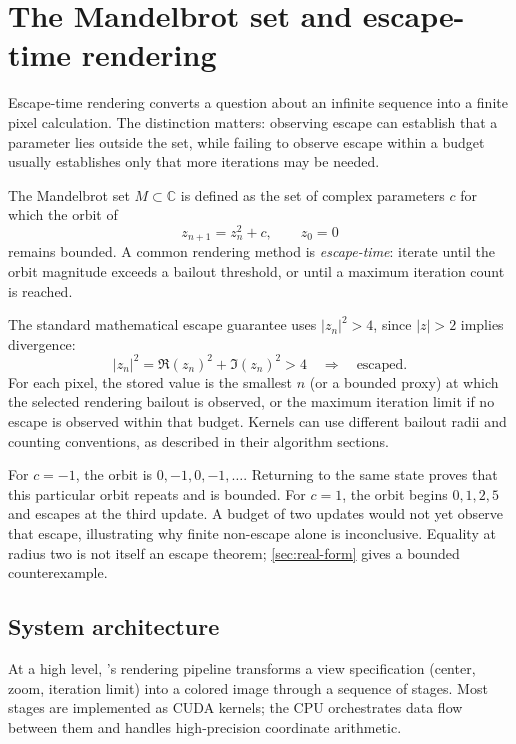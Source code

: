 \section{The Mandelbrot set and escape-time rendering}
\label{sec:mandelbrot-intro}

Escape-time rendering converts a question about an infinite sequence into a finite
pixel calculation. The distinction matters: observing escape can establish that a
parameter lies outside the set, while failing to observe escape within a budget
usually establishes only that more iterations may be needed.

The Mandelbrot set \(M\subset\mathbb{C}\) \cite{Mandelbrot1980Fractal} is defined as the set of complex
parameters \(c\) for which the orbit of
\begin{equation}
z_{n+1} = z_n^2 + c,\qquad z_0 = 0
\end{equation}
remains bounded. A common rendering method is \emph{escape-time}: iterate until
the orbit magnitude exceeds a bailout threshold, or until a maximum iteration
count is reached.

The standard mathematical escape guarantee uses \(|z_n|^2>4\), since
\(|z|>2\) implies divergence:
\begin{equation}
|z_n|^2 = \Re(z_n)^2 + \Im(z_n)^2 > 4 \quad\Rightarrow\quad \text{escaped.}
\end{equation}
For each pixel, the stored value is the smallest \(n\) (or a bounded proxy) at
which the selected rendering bailout is observed, or the maximum iteration limit
if no escape is observed within that budget. Kernels can use different bailout
radii and counting conventions, as described in their algorithm sections.

For $c=-1$, the orbit is $0,-1,0,-1,\ldots$. Returning to the same state proves
that this particular orbit repeats and is bounded. For $c=1$, the orbit begins
$0,1,2,5$ and escapes at the third update. A budget of two updates would not yet
observe that escape, illustrating why finite non-escape alone is inconclusive.
Equality at radius two is not itself an escape theorem; \cref{sec:real-form}
gives a bounded counterexample.


\subsection*{System architecture}
\label{sec:system-architecture}

At a high level, \FractalShark{}'s rendering pipeline transforms a view
specification (center, zoom, iteration limit) into a colored image through
a sequence of stages.  Most stages are implemented as CUDA kernels; the CPU
orchestrates data flow between them and handles high-precision coordinate
arithmetic.

